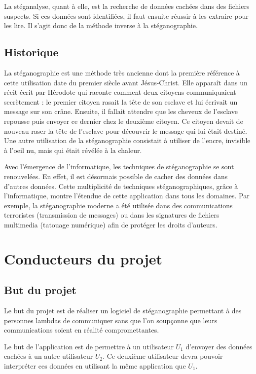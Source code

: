 \documentclass[11pt]{article}
\begin{document}
La stéganalyse, quant à elle, est la recherche de données cachées dans des fichiers suspects. Si ces données sont identifiées, il faut ensuite réussir à les
extraire pour les lire. Il s'agit donc de la méthode inverse à la stéganographie. 

\subsection{Historique}
La stéganographie est une méthode très ancienne dont la première référence à cette utilisation date du premier siècle avant Jésus-Christ. 
Elle apparaît dans un récit écrit par Hérodote qui raconte comment deux citoyens communiquaient secrètement : 
le premier citoyen rasait la tête de son esclave et lui écrivait un message sur son crâne. Ensuite, il fallait attendre que les cheveux de l'esclave repousse puis envoyer ce dernier chez le deuxième citoyen. 
Ce citoyen devait de nouveau raser la tête de l'esclave pour découvrir le message qui lui était destiné. 
Une autre utilisation de la stéganographie consistait à utiliser de l'encre, invisible à l'oeil nu, mais qui était révélée à la chaleur. 

Avec l'émergence de l'informatique, les techniques de stéganographie se sont renouvelées. En effet, il est désormais possible de cacher des données dans d'autres données. 
Cette multiplicité de techniques stéganographiques, grâce à l'informatique, montre l'étendue de cette application dans tous les domaines. 
Par exemple, la stéganographie moderne a été utilisée dans des communications terroristes (transmission de messages) ou dans les signatures de fichiers multimedia (tatouage numérique) afin de protéger les droits d'auteurs. 

\section{Conducteurs du projet}

\subsection{But du projet}
Le but du projet est de réaliser un logiciel de stéganographie permettant à des personnes lambdas de communiquer sans que l'on soupçonne que leurs communications soient en réalité compromettantes. 

Le but de l'application est de permettre à un utilisateur $U_1$ d'envoyer des données cachées à un autre utilisateur $U_2$. Ce deuxième utilisateur devra pouvoir interpréter ces données en utilisant la même application que $U_1$. 
\end{document}
